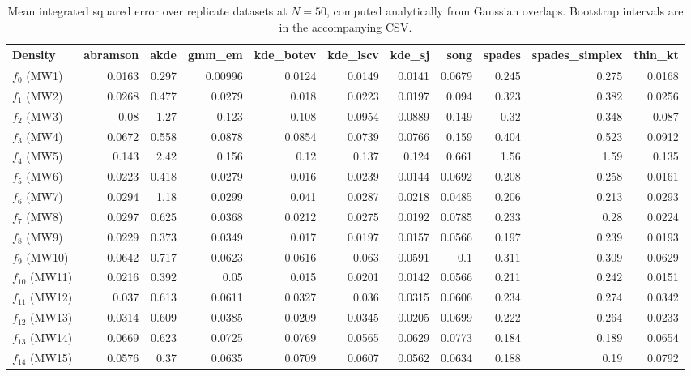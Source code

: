\begin{table}[htbp]
\centering
\caption{Mean integrated squared error over replicate datasets at $N=50$, computed analytically from Gaussian overlaps. Bootstrap intervals are in the accompanying CSV.}
\label{tab:ise-N50}
\begin{tabular}{lrrrrrrrrrr}
\toprule
Density & abramson & akde & gmm\_em & kde\_botev & kde\_lscv & kde\_sj & song & spades & spades\_simplex & thin\_kt \\
\midrule
$f_{0}$ (MW1) & 0.0163 & 0.297 & 0.00996 & 0.0124 & 0.0149 & 0.0141 & 0.0679 & 0.245 & 0.275 & 0.0168 \\
$f_{1}$ (MW2) & 0.0268 & 0.477 & 0.0279 & 0.018 & 0.0223 & 0.0197 & 0.094 & 0.323 & 0.382 & 0.0256 \\
$f_{2}$ (MW3) & 0.08 & 1.27 & 0.123 & 0.108 & 0.0954 & 0.0889 & 0.149 & 0.32 & 0.348 & 0.087 \\
$f_{3}$ (MW4) & 0.0672 & 0.558 & 0.0878 & 0.0854 & 0.0739 & 0.0766 & 0.159 & 0.404 & 0.523 & 0.0912 \\
$f_{4}$ (MW5) & 0.143 & 2.42 & 0.156 & 0.12 & 0.137 & 0.124 & 0.661 & 1.56 & 1.59 & 0.135 \\
$f_{5}$ (MW6) & 0.0223 & 0.418 & 0.0279 & 0.016 & 0.0239 & 0.0144 & 0.0692 & 0.208 & 0.258 & 0.0161 \\
$f_{6}$ (MW7) & 0.0294 & 1.18 & 0.0299 & 0.041 & 0.0287 & 0.0218 & 0.0485 & 0.206 & 0.213 & 0.0293 \\
$f_{7}$ (MW8) & 0.0297 & 0.625 & 0.0368 & 0.0212 & 0.0275 & 0.0192 & 0.0785 & 0.233 & 0.28 & 0.0224 \\
$f_{8}$ (MW9) & 0.0229 & 0.373 & 0.0349 & 0.017 & 0.0197 & 0.0157 & 0.0566 & 0.197 & 0.239 & 0.0193 \\
$f_{9}$ (MW10) & 0.0642 & 0.717 & 0.0623 & 0.0616 & 0.063 & 0.0591 & 0.1 & 0.311 & 0.309 & 0.0629 \\
$f_{10}$ (MW11) & 0.0216 & 0.392 & 0.05 & 0.015 & 0.0201 & 0.0142 & 0.0566 & 0.211 & 0.242 & 0.0151 \\
$f_{11}$ (MW12) & 0.037 & 0.613 & 0.0611 & 0.0327 & 0.036 & 0.0315 & 0.0606 & 0.234 & 0.274 & 0.0342 \\
$f_{12}$ (MW13) & 0.0314 & 0.609 & 0.0385 & 0.0209 & 0.0345 & 0.0205 & 0.0699 & 0.222 & 0.264 & 0.0233 \\
$f_{13}$ (MW14) & 0.0669 & 0.623 & 0.0725 & 0.0769 & 0.0565 & 0.0629 & 0.0773 & 0.184 & 0.189 & 0.0654 \\
$f_{14}$ (MW15) & 0.0576 & 0.37 & 0.0635 & 0.0709 & 0.0607 & 0.0562 & 0.0634 & 0.188 & 0.19 & 0.0792 \\
\bottomrule
\end{tabular}
\end{table}

